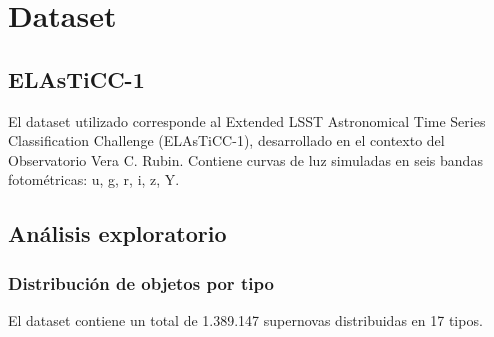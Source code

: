 \chapter{Dataset}

\section{ELAsTiCC-1}

El dataset utilizado corresponde al Extended LSST Astronomical Time Series Classification Challenge (ELAsTiCC-1), desarrollado en el contexto del Observatorio Vera C. Rubin. Contiene curvas de luz simuladas en seis bandas fotométricas: u, g, r, i, z, Y.

\section{Análisis exploratorio}

\subsection{Distribución de objetos por tipo}

El dataset contiene un total de 1.389.147 supernovas distribuidas en 17 tipos.

